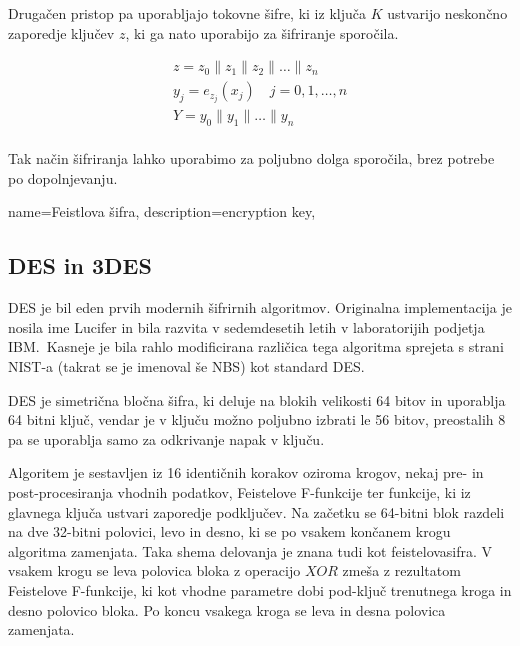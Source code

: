 \documentclass[12pt,a4paper,openany]{book}
\begin{document}
Drugačen pristop pa uporabljajo tokovne šifre, ki iz ključa $K$ ustvarijo neskončno zaporedje ključev $z$, ki ga nato uporabijo za šifriranje sporočila.

\begin{gather*}
z=z_0 \| z_1 \| z_2 \| \dotsc \| z_n \\
y_j=e_{z_j}(x_j) \quad j=0,1,\dotsc,n\\
Y = y_0 \| y_1 \| \dotsc \| y_n \\
\end{gather*}

Tak način šifriranja lahko uporabimo za poljubno dolga sporočila, brez potrebe po dopolnjevanju.



{
  name=Feistlova šifra,
  description={encryption key},
}

\subsection{DES in 3DES}

\gls{DES} je bil eden prvih modernih šifrirnih algoritmov. Originalna implementacija je nosila ime Lucifer in bila razvita v sedemdesetih letih v laboratorijih podjetja IBM.\  Kasneje je bila rahlo modificirana različica tega algoritma sprejeta s strani \acrshort{NIST}-a (takrat se je imenoval še \acrshort{NBS}) kot standard \gls{DES}.

\gls{DES} je simetrična bločna šifra, ki deluje na blokih velikosti 64 bitov in uporablja 64 bitni ključ, vendar je v ključu možno poljubno izbrati le 56 bitov, preostalih 8 pa se uporablja samo za odkrivanje napak v ključu.

Algoritem je sestavljen iz 16 identičnih korakov oziroma krogov, nekaj pre- in post-procesiranja vhodnih podatkov, Feistelove F-funkcije ter funkcije, ki iz glavnega ključa ustvari zaporedje podključev. Na začetku se 64-bitni blok razdeli na dve 32-bitni polovici, levo in desno, ki se po vsakem končanem krogu algoritma zamenjata. Taka shema delovanja je znana tudi kot \gls{feistelovasifra}. V vsakem krogu se leva polovica bloka z operacijo $XOR$ zmeša z rezultatom Feistelove F-funkcije, ki kot vhodne parametre dobi pod-ključ trenutnega kroga in desno polovico bloka. Po koncu vsakega kroga se leva in desna polovica zamenjata.
\end{document}
